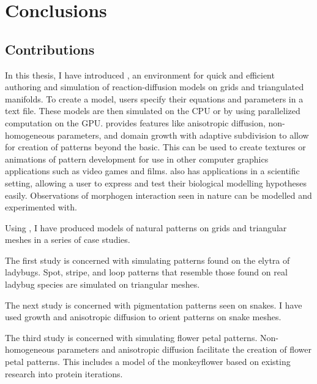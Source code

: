 \chapter{Conclusions}
\section{Contributions}

In this thesis, I have introduced \ProgramName{}, an environment for quick and efficient authoring and simulation of reaction-diffusion models on grids and triangulated manifolds. To create a model, users specify their equations and parameters in a text file. These models are then simulated on the CPU or by using parallelized computation on the GPU. \ProgramName{} provides features like anisotropic diffusion, non-homogeneous parameters, and domain growth with adaptive subdivision to allow for creation of patterns beyond the basic. This can be used to create textures or animations of pattern development for use in other computer graphics applications such as video games and films. \ProgramName{} also has applications in a scientific setting, allowing a user to express and test their biological modelling hypotheses easily. Observations of morphogen interaction seen in nature can be modelled and experimented with.

Using \ProgramName{}, I have produced models of natural patterns on grids and triangular meshes in a series of case studies. 

The first study is concerned with simulating patterns found on the elytra of ladybugs. Spot, stripe, and loop patterns that resemble those found on real ladybug species are simulated on triangular meshes. 

The next study is concerned with pigmentation patterns seen on snakes. I have used growth and anisotropic diffusion to orient patterns on snake meshes. 

The third study is concerned with simulating flower petal patterns. Non-homogeneous parameters and anisotropic diffusion facilitate the creation of flower petal patterns. This includes a model of the monkeyflower based on existing research into protein iterations. 

